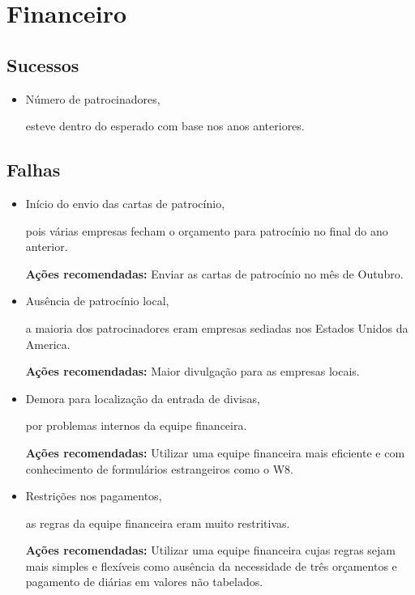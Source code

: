 \documentclass[12pt]{article}
\begin{document}
\newpage

\section*{Financeiro}

\subsection*{Sucessos}

\begin{itemize}
  \item Número de patrocinadores,

    esteve dentro do esperado com base nos anos anteriores.
\end{itemize}

\subsection*{Falhas}

\begin{itemize}
  \item Início do envio das cartas de patrocínio,

    pois várias empresas fecham o orçamento para patrocínio no final do ano
    anterior.

    \textbf{Ações recomendadas:} Enviar as cartas de patrocínio no mês de
    Outubro.

  \item Ausência de patrocínio local,

    a maioria dos patrocinadores eram empresas sediadas nos Estados Unidos da
    America.

    \textbf{Ações recomendadas:} Maior divulgação para as empresas locais.

  \item Demora para localização da entrada de divisas,

    por problemas internos da equipe financeira.

    \textbf{Ações recomendadas:} Utilizar uma equipe financeira mais eficiente e
    com conhecimento de formulários estrangeiros como o W8.

  \item Restrições nos pagamentos,

    as regras da equipe financeira eram muito restritivas.

    \textbf{Ações recomendadas:} Utilizar uma equipe financeira cujas regras
    sejam mais simples e flexíveis como ausência da necessidade de três
    orçamentos e pagamento de diárias em valores não tabelados.

\end{itemize}
\end{document}
